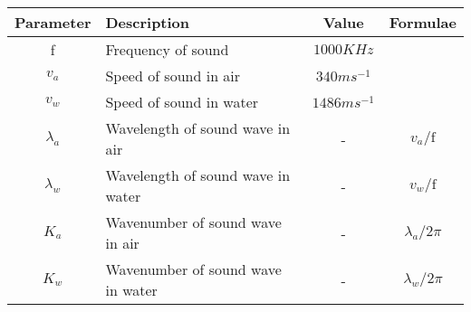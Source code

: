\renewcommand{\arraystretch}{2}
\begin{tabular}{|c|p{2cm}|c|c|}
\hline 
\setlength{\tabcolsep}{1pt}
\textbf{Parameter}  &\textbf{Description} &\textbf{Value} &\textbf{Formulae} \\
\hline
f  & Frequency of sound &$1000KHz$  &\\
\hline
$v_a$ & Speed of sound in air &$340 ms^{-1}$ &\\
\hline
$v_w $ & Speed of sound in water &$ 1486 ms^{-1}$ & \\ 
\hline
$\lambda_a$& Wavelength of sound wave in air & - & $v_a/\text{f}$\\
\hline
$\lambda_w$ & Wavelength of sound wave in water& - & $v_w/\text{f}$ \\
\hline
$K_a $ & Wavenumber of sound wave in air & - & $\lambda_a/2\pi$\\
\hline
$K_w $ & Wavenumber of sound wave in water & - & $\lambda_w/2\pi$\\
\hline
\end{tabular}
